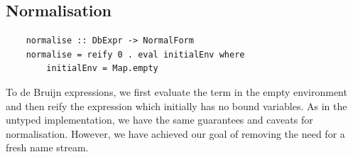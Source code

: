 \subsection{Normalisation}

\begin{lstlisting}
    normalise :: DbExpr -> NormalForm
    normalise = reify 0 . eval initialEnv where
        initialEnv = Map.empty  
\end{lstlisting}

To  de Bruijn expressions, we first evaluate the term in the empty environment and then reify the expression which initially has no bound variables. As in the untyped implementation, we have the same guarantees and caveats for normalisation. However, we have achieved our goal of removing the need for a fresh name stream.